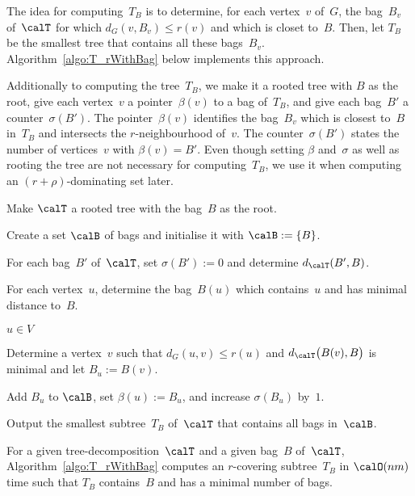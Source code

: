 The idea for computing~$T_B$ is to determine, for each vertex~$v$ of~$G$, the bag~$B_v$ of~$\calT$ for which $d_G(v, B_v) \leq r(v)$ and which is closet to~$B$.
Then, let $T_B$ be the smallest tree that contains all these bags~$B_v$.
Algorithm~\ref{algo:T_rWithBag} below implements this approach.

Additionally to computing the tree~$T_B$, we make it a rooted tree with $B$ as the root, give each vertex~$v$ a pointer~$\beta(v)$ to a bag of~$T_B$, and give each bag~$B'$ a counter~$\sigma(B')$.
The pointer~$\beta(v)$ identifies the bag~$B_v$ which is closest to~$B$ in~$T_B$ and intersects the $r$-neighbourhood of~$v$.
The counter~$\sigma(B')$ states the number of vertices~$v$ with $\beta(v) = B'$.
Even though setting $\beta$ and~$\sigma$ as well as rooting the tree are not necessary for computing~$T_B$, we use it when computing an $(r + \rho)$-dominating set later.

\begin{algorithm}
    [htb]
    \caption
    {%
        Computes the smallest $r$-covering subtree~$T_B$ of a given tree-decomposition~$\calT$ that contains a given bag~$B$ of~$\calT$.
    }
    \label{algo:T_rWithBag}

Make $\calT$ a rooted tree with the bag~$B$ as the root.

Create a set $\calB$ of bags and initialise it with $\calB := \{ B \}$.

For each bag~$B'$ of~$\calT$, set $\sigma(B') := 0$ and determine $d_\calT(B', B)$.
\label{line:bagDist}

For each vertex~$u$, determine the bag~$B(u)$ which contains~$u$ and has minimal distance to~$B$.
\label{line:determineBWithU}

\ForEach
{%
    \( u \in V \)%
    \label{line:loopBv}
}
{%
    Determine a vertex~$v$ such that $d_G(u, v) \leq r(u)$ and $d_\calT \big( B(v), B \big)$ is minimal and let $B_u := B(v)$.
    \label{line:determineBu}

    Add $B_u$ to $\calB$, set $\beta(u) := B_u$, and increase $\sigma(B_u)$ by~$1$.
    \label{line:addBvToB}
}

Output the smallest subtree~$T_B$ of~$\calT$ that contains all bags in~$\calB$.
\label{line:ConstructTB}
\end{algorithm}

\begin{lemma}
    \label{lem:TBAlgo}
For a given tree-decomposition~\( \calT \) and a given bag~\( B \) of~\( \calT \), Algorithm~\ref{algo:T_rWithBag} computes an \( r \)-covering subtree~\( T_B \) in \( \calO(nm) \) time such that \( T_B \) contains~\( B \) and has a minimal number of bags.
\end{lemma}

